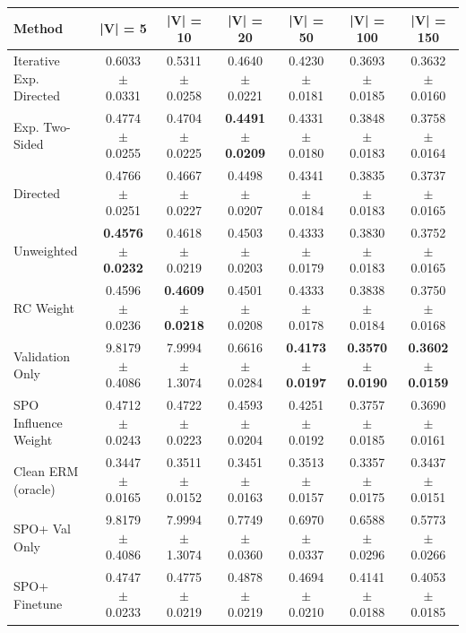 \begin{tabular}{lcccccc}
\toprule
Method & |V| = 5 & |V| = 10 & |V| = 20 & |V| = 50 & |V| = 100 & |V| = 150 \\
\midrule
Iterative Exp. Directed & 0.6033 $\pm$ 0.0331 & 0.5311 $\pm$ 0.0258 & 0.4640 $\pm$ 0.0221 & 0.4230 $\pm$ 0.0181 & 0.3693 $\pm$ 0.0185 & 0.3632 $\pm$ 0.0160 \\
Exp. Two-Sided & 0.4774 $\pm$ 0.0255 & 0.4704 $\pm$ 0.0225 & \textbf{0.4491 $\pm$ 0.0209} & 0.4331 $\pm$ 0.0180 & 0.3848 $\pm$ 0.0183 & 0.3758 $\pm$ 0.0164 \\
Directed & 0.4766 $\pm$ 0.0251 & 0.4667 $\pm$ 0.0227 & 0.4498 $\pm$ 0.0207 & 0.4341 $\pm$ 0.0184 & 0.3835 $\pm$ 0.0183 & 0.3737 $\pm$ 0.0165 \\
Unweighted & \textbf{0.4576 $\pm$ 0.0232} & 0.4618 $\pm$ 0.0219 & 0.4503 $\pm$ 0.0203 & 0.4333 $\pm$ 0.0179 & 0.3830 $\pm$ 0.0183 & 0.3752 $\pm$ 0.0165 \\
RC Weight & 0.4596 $\pm$ 0.0236 & \textbf{0.4609 $\pm$ 0.0218} & 0.4501 $\pm$ 0.0208 & 0.4333 $\pm$ 0.0178 & 0.3838 $\pm$ 0.0184 & 0.3750 $\pm$ 0.0168 \\
Validation Only & 9.8179 $\pm$ 0.4086 & 7.9994 $\pm$ 1.3074 & 0.6616 $\pm$ 0.0284 & \textbf{0.4173 $\pm$ 0.0197} & \textbf{0.3570 $\pm$ 0.0190} & \textbf{0.3602 $\pm$ 0.0159} \\
SPO Influence Weight & 0.4712 $\pm$ 0.0243 & 0.4722 $\pm$ 0.0223 & 0.4593 $\pm$ 0.0204 & 0.4251 $\pm$ 0.0192 & 0.3757 $\pm$ 0.0185 & 0.3690 $\pm$ 0.0161 \\
Clean ERM (oracle) & 0.3447 $\pm$ 0.0165 & 0.3511 $\pm$ 0.0152 & 0.3451 $\pm$ 0.0163 & 0.3513 $\pm$ 0.0157 & 0.3357 $\pm$ 0.0175 & 0.3437 $\pm$ 0.0151 \\
SPO+ Val Only & 9.8179 $\pm$ 0.4086 & 7.9994 $\pm$ 1.3074 & 0.7749 $\pm$ 0.0360 & 0.6970 $\pm$ 0.0337 & 0.6588 $\pm$ 0.0296 & 0.5773 $\pm$ 0.0266 \\
SPO+ Finetune & 0.4747 $\pm$ 0.0233 & 0.4775 $\pm$ 0.0219 & 0.4878 $\pm$ 0.0219 & 0.4694 $\pm$ 0.0210 & 0.4141 $\pm$ 0.0188 & 0.4053 $\pm$ 0.0185 \\
\bottomrule
\end{tabular}
